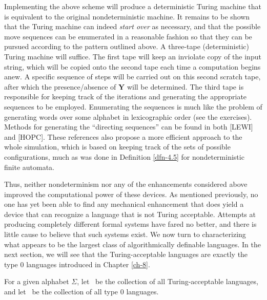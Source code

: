 Implementing the above scheme will produce a deterministic Turing machine that
is equivalent to the original nondeterministic machine. It remains to be shown
that the Turing machine can indeed \emph{start over} as necessary, and that the
possible move sequences can be enumerated in a reasonable fashion so that they
can be pursued according to the pattern outlined above. A three-tape
(deterministic) Turing machine will suffice. The first tape will keep an
inviolate copy of the input string, which will be copied onto the second tape
each time a computation begins anew. A specific sequence of steps will be
carried out on this second scratch tape, after which the presence/absence of $\pmb{Y}$
will be determined. The third tape is responsible for keeping track of the
iterations and generating the appropriate sequences to be employed. Enumerating
the sequences is much like the problem of generating words over some alphabet in
lexicographic order (see the exercises). Methods for generating the ``directing
sequences'' can be found in both [LEWI] and [HOPC]. These references also
propose a more efficient approach to the whole simulation, which is based on
keeping track of the sets of possible configurations, much as was done in
Definition \ref{dfn-4.5} for nondeterministic finite automata.

Thus, neither nondeterminism nor any of the enhancements considered above
improved the computational power of these devices. As mentioned previously, no
one has yet been able to find any mechanical enhancement that does yield a
device that can recognize a language that is not Turing acceptable. Attempts at
producing completely different formal systems have fared no better, and there is
little cause to believe that such systems exist. We now turn to characterizing
what appears to be the largest class of algorithmically definable languages. In
the next section, we will see that the Turing-acceptable languages are exactly
the type 0 languages introduced in Chapter \ref{ch-8}.

\begin{dfn}\label{dfn-11.4}
For a given alphabet $\Sigma$, let \TSIG\ be the collection of all
Turing-acceptable languages, and let \ZSIG\ be the collection of all type 0
languages.
\end{dfn}

